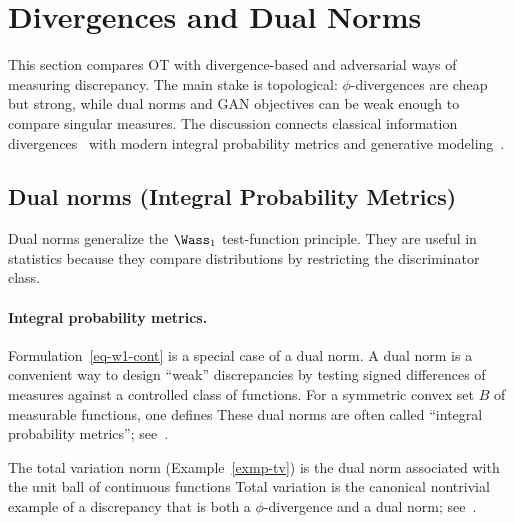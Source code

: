 \section{Divergences and Dual Norms}
\label{sec-divergences-dual-norms}


This section compares OT with divergence-based and adversarial ways of measuring discrepancy. The main stake is topological: $\phi$-divergences are cheap but strong, while dual norms and GAN objectives can be weak enough to compare singular measures. The discussion connects classical information divergences~\cite{ciszar1967information,ali1966general} with modern integral probability metrics and generative modeling~\cite{sriperumbudur2009integral,GAN,WassersteinGAN}.

\subsection{Dual norms (Integral Probability Metrics)}
\label{sec-dual-norms}

Dual norms generalize the $\Wass_1$ test-function principle. They are useful in statistics because they compare distributions by restricting the discriminator class.

\paragraph{Integral probability metrics.}

Formulation~\eqref{eq-w1-cont} is a special case of a dual norm. A dual norm is a convenient way to design ``weak'' discrepancies by testing signed differences of measures against a controlled class of functions. For a symmetric convex set $B$ of measurable functions, one defines
These dual norms are often called ``integral probability metrics''; see~\cite{sriperumbudur2012empirical,sriperumbudur2009integral,sriperumbudur2008injective}.

\begin{example}
The total variation norm (Example~\ref{exmp-tv}) is the dual norm associated with the unit ball of continuous functions
Total variation is the canonical nontrivial example of a discrepancy that is both a $\phi$-divergence and a dual norm; see~\cite{sriperumbudur2009integral}.
\end{example}

